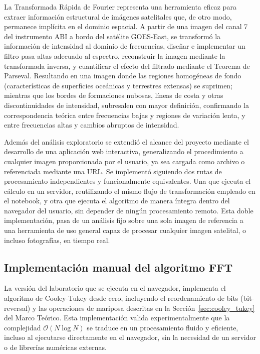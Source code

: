 \documentclass[conference]{IEEEtran}
\begin{document}
La Transformada
Rápida de Fourier representa una herramienta eficaz para extraer información
estructural de imágenes satelitales que, de otro modo, permanece implícita en
el dominio espacial. A partir de una imagen del canal 7 del instrumento ABI a
bordo del satélite GOES-East, se transformó la información de intensidad al dominio de frecuencias, diseñar e implementar un filtro
pasa-altas adecuado al espectro, reconstruir la imagen mediante la
transformada inversa, y cuantificar el efecto del filtrado mediante el Teorema
de Parseval. Resultando en una imagen donde las regiones homogéneas de fondo (características de superficies oceánicas y terrestres extensas) se
suprimen; mientras que los bordes de formaciones nubosas, líneas de costa y
otras discontinuidades de intensidad, subresalen con mayor definición, confirmando la correspondencia teórica entre frecuencias bajas y regiones de variación lenta, y
entre frecuencias altas y cambios abruptos de intensidad.

Además del análisis exploratorio se extendió el alcance del proyecto mediante el desarrollo de una
aplicación web interactiva, generalizando el procedimiento a cualquier imagen
proporcionada por el usuario, ya sea cargada como archivo o referenciada
mediante una URL. Se implementó siguiendo dos rutas de
procesamiento independientes y funcionalmente equivalentes. Una que ejecuta
el cálculo en un servidor, reutilizando el mismo flujo de transformación empleado en el notebook, y otra que ejecuta el algoritmo de manera
íntegra dentro del navegador del usuario, sin depender de ningún
procesamiento remoto. Esta doble implementación, pasa de un análisis fijo sobre una sola
imagen de referencia a una herramienta de uso general capaz de procesar cualquier imagen satelital, o incluso fotografías, en tiempo real.

\subsection{Implementación manual del algoritmo FFT}

La versión del laboratorio que se ejecuta en el navegador,
implementa el algoritmo de Cooley-Tukey desde cero, incluyendo el reordenamiento de bits (bit-reversal) y las operaciones de mariposa descritas en la Sección~\ref{sec:cooley_tukey} del Marco Teórico. Esta
implementación valida experimentalmente que la complejidad 
$\mathcal{O}(N\log N)$ se traduce en un procesamiento
fluido y eficiente, incluso al ejecutarse directamente en el navegador, sin la necesidad de un servidor o de librerías numéricas externas.
\end{document}
